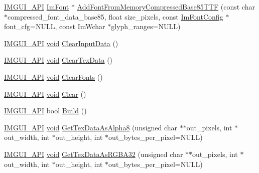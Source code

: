 \begin{DoxyCompactItemize}
\item 
\hyperlink{imgui_8h_a43829975e84e45d1149597467a14bbf5}{I\+M\+G\+U\+I\+\_\+\+A\+PI} \hyperlink{structImFont}{Im\+Font} $\ast$ \hyperlink{structImFontAtlas_ab43b930beb57c0b998f42f4586677956}{Add\+Font\+From\+Memory\+Compressed\+Base85\+T\+TF} (const char $\ast$compressed\+\_\+font\+\_\+data\+\_\+base85, float size\+\_\+pixels, const \hyperlink{structImFontConfig}{Im\+Font\+Config} $\ast$font\+\_\+cfg=N\+U\+LL, const Im\+Wchar $\ast$glyph\+\_\+ranges=N\+U\+LL)
\item 
\hyperlink{imgui_8h_a43829975e84e45d1149597467a14bbf5}{I\+M\+G\+U\+I\+\_\+\+A\+PI} \hyperlink{imgui__impl__opengl3__loader_8h_ac668e7cffd9e2e9cfee428b9b2f34fa7}{void} \hyperlink{structImFontAtlas_a3f5bcbb7a2683b1af106fcf4e1217662}{Clear\+Input\+Data} ()
\item 
\hyperlink{imgui_8h_a43829975e84e45d1149597467a14bbf5}{I\+M\+G\+U\+I\+\_\+\+A\+PI} \hyperlink{imgui__impl__opengl3__loader_8h_ac668e7cffd9e2e9cfee428b9b2f34fa7}{void} \hyperlink{structImFontAtlas_a3ede4bd513bec044c77ac392ad9c6e86}{Clear\+Tex\+Data} ()
\item 
\hyperlink{imgui_8h_a43829975e84e45d1149597467a14bbf5}{I\+M\+G\+U\+I\+\_\+\+A\+PI} \hyperlink{imgui__impl__opengl3__loader_8h_ac668e7cffd9e2e9cfee428b9b2f34fa7}{void} \hyperlink{structImFontAtlas_ad5c2560d708bd0c389e9bd9da2d9b055}{Clear\+Fonts} ()
\item 
\hyperlink{imgui_8h_a43829975e84e45d1149597467a14bbf5}{I\+M\+G\+U\+I\+\_\+\+A\+PI} \hyperlink{imgui__impl__opengl3__loader_8h_ac668e7cffd9e2e9cfee428b9b2f34fa7}{void} \hyperlink{structImFontAtlas_a8f6d01c671d8670f991ba651bbaf7e77}{Clear} ()
\item 
\hyperlink{imgui_8h_a43829975e84e45d1149597467a14bbf5}{I\+M\+G\+U\+I\+\_\+\+A\+PI} bool \hyperlink{structImFontAtlas_a81e39e30dffa4dd7e458a53297451e27}{Build} ()
\item 
\hyperlink{imgui_8h_a43829975e84e45d1149597467a14bbf5}{I\+M\+G\+U\+I\+\_\+\+A\+PI} \hyperlink{imgui__impl__opengl3__loader_8h_ac668e7cffd9e2e9cfee428b9b2f34fa7}{void} \hyperlink{structImFontAtlas_aeff1a1044a1ab68d8f27bb2819cd9f44}{Get\+Tex\+Data\+As\+Alpha8} (unsigned char $\ast$$\ast$out\+\_\+pixels, int $\ast$out\+\_\+width, int $\ast$out\+\_\+height, int $\ast$out\+\_\+bytes\+\_\+per\+\_\+pixel=N\+U\+LL)
\item 
\hyperlink{imgui_8h_a43829975e84e45d1149597467a14bbf5}{I\+M\+G\+U\+I\+\_\+\+A\+PI} \hyperlink{imgui__impl__opengl3__loader_8h_ac668e7cffd9e2e9cfee428b9b2f34fa7}{void} \hyperlink{structImFontAtlas_a8abb0c4e67ebb38249d4df71218c4eec}{Get\+Tex\+Data\+As\+R\+G\+B\+A32} (unsigned char $\ast$$\ast$out\+\_\+pixels, int $\ast$out\+\_\+width, int $\ast$out\+\_\+height, int $\ast$out\+\_\+bytes\+\_\+per\+\_\+pixel=N\+U\+LL)

\end{DoxyCompactItemize}
